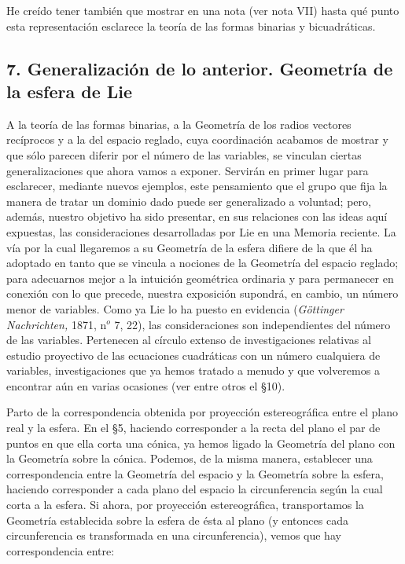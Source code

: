 \documentclass[a4paper, 12pt]{article}
\begin{document}
He creído tener también que mostrar en una nota (ver nota VII) hasta qué punto esta representación esclarece la teoría de las formas binarias y bicuadráticas. 



\subsection*{7. Generalización de lo anterior. Geometría de la esfera de Lie}

A la teoría de las formas binarias, a la Geometría de los radios vectores recíprocos y a la del espacio reglado, cuya coordinación acabamos de mostrar y que sólo parecen diferir por el número de las variables, se vinculan ciertas generalizaciones que ahora vamos a exponer. Servirán en primer lugar para esclarecer, mediante nuevos ejemplos, este pensamiento que el grupo que fija la manera de tratar un dominio dado puede ser generalizado a voluntad; pero, además, nuestro objetivo ha sido presentar, en sus relaciones con las ideas aquí expuestas, las consideraciones desarrolladas por Lie en una Memoria reciente. La vía por la cual llegaremos a su Geometría de la esfera difiere de la que él ha adoptado en tanto que se vincula a nociones de la Geometría del espacio reglado; para adecuarnos mejor a la intuición geométrica ordinaria y para permanecer en conexión con lo que precede, nuestra exposición supondrá, en cambio, un número menor de variables. Como ya Lie lo ha puesto en evidencia (\textit{Göttinger Nachrichten, }1871, n$^{o}$ 7, 22), las consideraciones son independientes del número de las variables. Pertenecen al círculo extenso de investigaciones relativas al estudio proyectivo de las ecuaciones cuadráticas con un número cualquiera de variables, investigaciones que ya hemos tratado a menudo y que volveremos a encontrar aún en varias ocasiones (ver entre otros el {\S}10).

Parto de la correspondencia obtenida por proyección estereográfica entre el plano real y la esfera. En el {\S}5, haciendo corresponder a la recta del plano el par de puntos en que ella corta una cónica, ya hemos ligado la Geometría del plano con la Geometría sobre la cónica. Podemos, de la misma manera, establecer una correspondencia entre la Geometría del espacio y la Geometría sobre la esfera, haciendo corresponder a cada plano del espacio la circunferencia según la cual corta a la esfera. Si ahora, por proyección estereográfica, transportamos la Geometría establecida sobre la esfera de ésta al plano (y entonces cada circunferencia es transformada en una circunferencia), vemos que hay correspondencia entre: 
\end{document}

